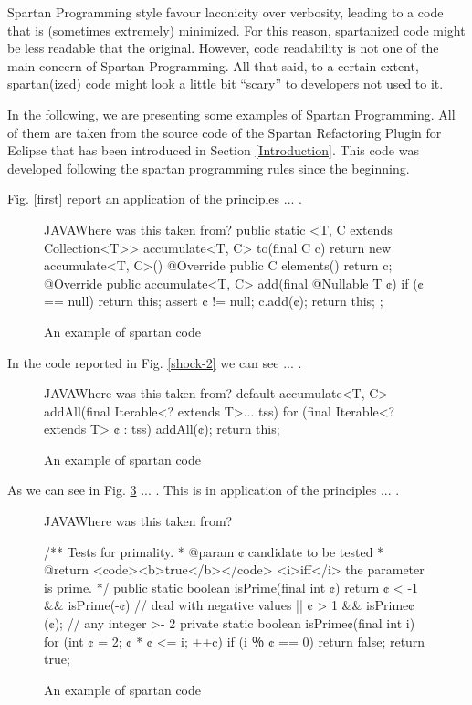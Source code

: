 Spartan Programming style favour laconicity over verbosity, leading to 
a code that is (sometimes extremely) minimized. For this reason, spartanized code might 
be less readable that the original. However, code readability is not one of 
the main concern of Spartan Programming. All that said, to a certain extent, 
spartan(ized) code might look a little bit ``scary'' to developers not used to it.

In the following, we are presenting some examples of Spartan Programming.
All of them are taken from the source code of the Spartan Refactoring 
Plugin for Eclipse that has been introduced in Section \ref{Introduction}. 
This code was developed following the spartan programming rules since 
the beginning.

Fig. \ref{first} report an application of the principles ... .

\begin{figure}[h]
\label{figure:first}
\caption{An example of spartan code}
  \begin{Code}{JAVA}{Where was this taken from?}
public static <T, C extends Collection<T>> accumulate<T, C> 
  to(final C c) {
    return new accumulate<T, C>() {
      @Override public C elements() {
        return c;
      }
      @Override public accumulate<T, C> 
        add(final @Nullable T ¢) {
          if (¢ == null)
            return this;
          assert ¢ != null;
          c.add(¢);
          return this;
        }
    };
  }
\end{Code}
\end{figure}

In the code reported in Fig. \ref{shock-2} we can see ... .

\begin{figure}[h]
\label{figure:shock-2}
\caption{An example of spartan code}
\begin{Code}{JAVA}{Where was this taken from?}
default accumulate<T, C> 
    addAll(final Iterable<? extends T>... tss) {
      for (final Iterable<? extends T> ¢ : tss)
        addAll(¢);
      return this;
    }
\end{Code}

\end{figure}

As we can see in Fig. \ref{figure:shock-2} ... . This is 
in application of the principles ... .

\begin{figure}[h]
\begin{Code}{JAVA}{Where was this taken from?}
\label{figure:shock-2}
\caption{An example of spartan code}
/** Tests for primality.
  * @param ¢ candidate to be tested
  * @return <code><b>true</b></code> <i>iff</i> the parameter is prime. */
public static boolean isPrime(final int ¢) {
  return ¢ < -1 && isPrime(-¢) // deal with negative values
      || ¢ > 1 && isPrime¢(¢); // any integer >- 2
}
private static boolean isPrime¢(final int i) {
  for (int ¢ = 2; ¢ * ¢ <= i; ++¢)
    if (i ％ ¢ == 0)
      return false;
  return true;
}
\end{Code}
\end{figure}

